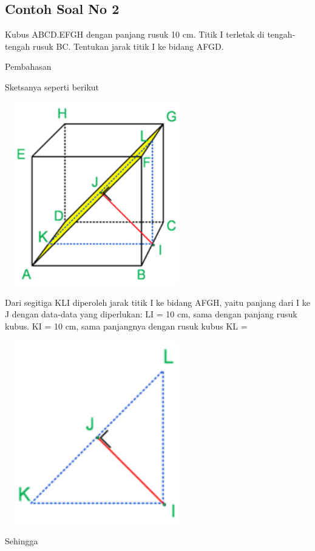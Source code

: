 \documentclass[11pt,fleqn]{book} %
\begin{document}
\subsection{Contoh Soal No 2}
	
	Kubus ABCD.EFGH dengan panjang rusuk 10 cm. Titik I terletak di tengah-tengah  rusuk BC. Tentukan jarak titik I ke bidang AFGD.

	Pembahasan

	Sketsanya seperti berikut
	
\includegraphics[width = 8cm, height= 8cm]{Pictures/dede14.png}

	Dari segitiga KLI diperoleh jarak titik I ke bidang AFGH, yaitu panjang dari I ke J dengan data-data yang diperlukan: 	LI = 10 cm, sama dengan panjang rusuk kubus.  KI = 10 cm, sama panjangnya dengan rusuk kubus KL = %
	
	\includegraphics[width = 8cm, height= 8cm]{Pictures/dede15.png}
	
	Sehingga
	
\end{document}
